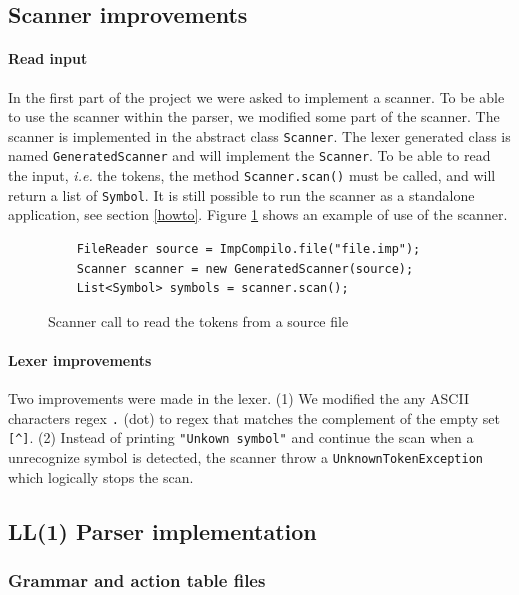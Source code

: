 \documentclass[letterpaper]{article}
\begin{document}
\subsection{Scanner improvements}

\paragraph{Read input}
In the first part of the project we were asked to implement a scanner.
To be able to use the scanner within the parser, we modified some part of the
scanner. The scanner is implemented in the abstract class \texttt{Scanner}.
The lexer generated class is named \texttt{GeneratedScanner} and will
implement the \texttt{Scanner}. To be able to read the input, \textit{i.e.}
the tokens, the method \texttt{Scanner.scan()} must be called, and
will return a list of \texttt{Symbol}. It is still possible to run the scanner
as a standalone application, see section \ref{howto}.
Figure \ref{fig:scannercall} shows an example of use of the scanner.

\begin{figure}[H]
    \begin{lstlisting}
    FileReader source = ImpCompilo.file("file.imp");
    Scanner scanner = new GeneratedScanner(source);
    List<Symbol> symbols = scanner.scan();
    \end{lstlisting}
    \caption{Scanner call to read the tokens from a source file}
    \label{fig:scannercall}
\end{figure}

\paragraph{Lexer improvements}

Two improvements were made in the lexer. (1) We modified the any ASCII
characters
regex \texttt{.} (dot) to regex that matches the complement of the
empty set \texttt{[\textasciicircum]}.
(2) Instead of printing \texttt{"Unkown symbol"}
and continue the scan when
a unrecognize symbol is detected, the scanner throw a
\texttt{UnknownTokenException} which logically stops the scan.



\subsection{LL(1) Parser implementation}

\subsubsection{Grammar and action table files}
\end{document}
